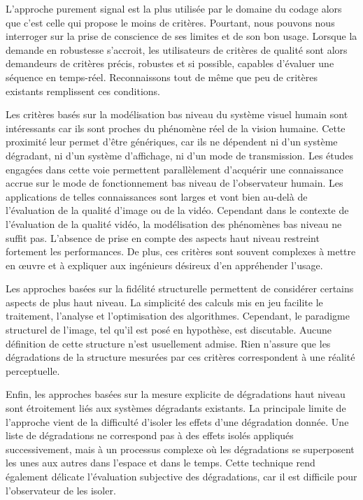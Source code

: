 L'approche purement signal est la plus utilisée par le domaine du codage alors que c'est celle qui propose le moins de critères. Pourtant, nous pouvons nous interroger sur la prise de conscience de ses limites et de son bon usage. Lorsque la demande en robustesse s'accroit, les utilisateurs de critères de qualité sont alors demandeurs de critères précis, robustes et si possible, capables d'évaluer une séquence en temps-réel. Reconnaissons tout de même que peu de critères existants remplissent ces conditions.

Les critères basés sur la modélisation bas niveau du système visuel humain sont intéressants car ils sont proches du phénomène réel de la vision humaine. Cette proximité leur permet d'être génériques, car ils ne dépendent ni d'un système dégradant, ni d'un système d'affichage, ni d'un mode de transmission. Les études engagées dans cette voie permettent parallèlement d'acquérir une connaissance accrue sur le mode de fonctionnement bas niveau de l'observateur humain. Les applications de telles connaissances sont larges et vont bien au-delà de l'évaluation de la qualité d'image ou de la vidéo. Cependant dans le contexte de l'évaluation de la qualité vidéo, la modélisation des phénomènes bas niveau ne suffit pas. L'absence de prise en compte des aspects haut niveau restreint fortement les performances. De plus, ces critères sont souvent complexes à mettre en \oe uvre et à expliquer aux ingénieurs désireux d'en appréhender l'usage.

Les approches basées sur la fidélité structurelle permettent de considérer certains aspects de plus haut niveau. La simplicité des calculs mis en jeu facilite le traitement, l'analyse et l'optimisation des algorithmes. Cependant, le paradigme structurel de l'image, tel qu'il est posé en hypothèse, est discutable. Aucune définition de cette structure n'est usuellement admise. Rien n'assure que les dégradations de la structure mesurées par ces critères correspondent à une réalité perceptuelle.

Enfin, les approches basées sur la mesure explicite de dégradations haut niveau sont étroitement liés aux systèmes dégradants existants. La principale limite de l'approche vient de la difficulté d'isoler les effets d'une dégradation donnée. Une liste de dégradations ne correspond pas à des effets isolés appliqués successivement, mais à un processus complexe où les dégradations se superposent les unes aux autres dans l'espace et dans le temps. Cette technique rend également délicate l'évaluation subjective des dégradations, car il est difficile pour l'observateur de les isoler.


